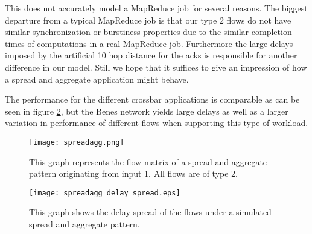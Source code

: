 \documentclass{IEEEtran}%
\begin{document}
This does not accurately model a MapReduce job for several reasons.  The biggest departure from a typical MapReduce job is that our type 2 flows do not have similar synchronization or burstiness properties due to the similar completion times of computations in a real MapReduce job.  Furthermore the large delays imposed by the artificial 10 hop distance for the acks is responsible for another difference in our model.  Still we hope that it suffices to give an impression of how a spread and aggregate application might behave.

The performance for the different crossbar applications is comparable as can be seen in figure \ref{spreadagg_delay_spread}, but the Benes network yields large delays as well as a larger variation in performance of different flows when supporting this type of workload.

\begin{figure}%
	 \texttt{[image: spreadagg.png]}
	\caption{This graph represents the flow matrix of a spread and aggregate pattern originating from input 1.  All flows are of type 2.}
	\label{spreadagg}
\end{figure}

\begin{figure}%
	 \texttt{[image: spreadagg\_delay\_spread.eps]}
	\caption{This graph shows the delay spread of the flows under a simulated spread and aggregate pattern.}
	\label{spreadagg_delay_spread}
\end{figure}

\end{document}
